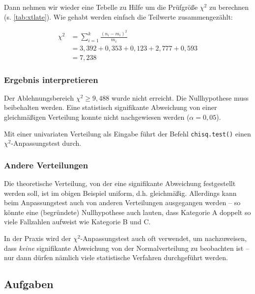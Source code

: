 \documentclass[
  ngerman,
]{article}
\begin{document}
Dann nehmen wir wieder eine Tebelle zu Hilfe um die Prüfgröße \(\chi^2\) zu berechnen (s. \autoref{tab:xtlate}). Wie gehabt werden einfach die Teilwerte zusammengezählt:

\[\begin{aligned}
\chi^2 &= \sum_{i=1}^{k}\frac{(n_{i}-m_{i})^{2}}{m_{i}}\\[4pt]
&=3,392 +  0,353 +  0,123 +  2,777 + 0,593\\
&=7,238
\end{aligned}\]

\hypertarget{ergebnis-interpretieren-3}{%
\subsubsection{Ergebnis interpretieren}\label{ergebnis-interpretieren-3}}

Der Ablehnungsbereich \(\chi^2 \geq 9,488\) wurde nicht erreicht. Die Nullhypothese muss beibehalten werden. Eine statistisch signifikante Abweichung von einer gleichmäßigen Verteilung konnte nicht nachgewiesen werden (\(\alpha=0,05\)).

\begin{rtip}
Mit einer univariaten Verteilung als Eingabe führt der Befehl {\tt chisq.test()} einen $\chi^2$-Anpassungstest durch.
\end{rtip}

\hypertarget{andere-verteilungen}{%
\subsubsection{Andere Verteilungen}\label{andere-verteilungen}}

Die theoretische Verteilung, von der eine signifikante Abweichung festgestellt werden soll, ist im obigen Beispiel uniform, d.h. gleichmäßig. Allerdings kann beim Anpassungstest auch von anderen Verteilungen ausgegangen werden -- so könnte eine (begründete) Nullhypothese auch lauten, dass Kategorie A doppelt so viele Fallzahlen aufweist wie Kategorie B und C.

In der Praxis wird der \(\chi^2\)-Anpassungstest auch oft verwendet, um nachzuweisen, dass \emph{keine} signifikante Abweichung von der Normalverteilung zu beobachten ist -- nur dann dürfen nämlich viele statistische Verfahren durchgeführt werden.

\hypertarget{aufgaben-9}{%
\subsection{Aufgaben}\label{aufgaben-9}}
\end{document}
